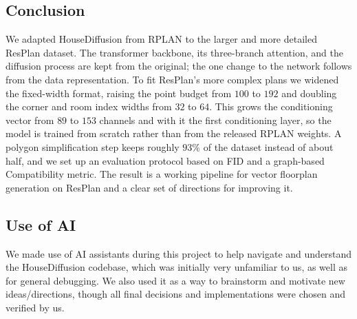 \subsection{Conclusion}
We adapted HouseDiffusion from RPLAN to the larger and more detailed ResPlan
dataset. The transformer backbone, its three-branch attention, and the diffusion
process are kept from the original; the one change to the network follows from the
data representation. To fit ResPlan's more complex plans we widened the fixed-width
format, raising the point budget from $100$ to $192$ and doubling the corner and
room index widths from $32$ to $64$. This grows the conditioning vector from $89$
to $153$ channels and with it the first conditioning layer, so the model is trained
from scratch rather than from the released RPLAN weights. A polygon simplification
step keeps roughly $93\%$ of the dataset instead of about half, and we set up an
evaluation protocol based on FID and a graph-based Compatibility metric. The result
is a working pipeline for vector floorplan generation on ResPlan and a clear set of
directions for improving it.

\subsection{Use of AI}
We made use of AI assistants during this project to help navigate and understand the HouseDiffusion codebase, which was initially very unfamiliar to us, as well as for general debugging. We also used it as a way to brainstorm and motivate new ideas/directions, though all final decisions and implementations were chosen and verified by us.

\label{discuss}